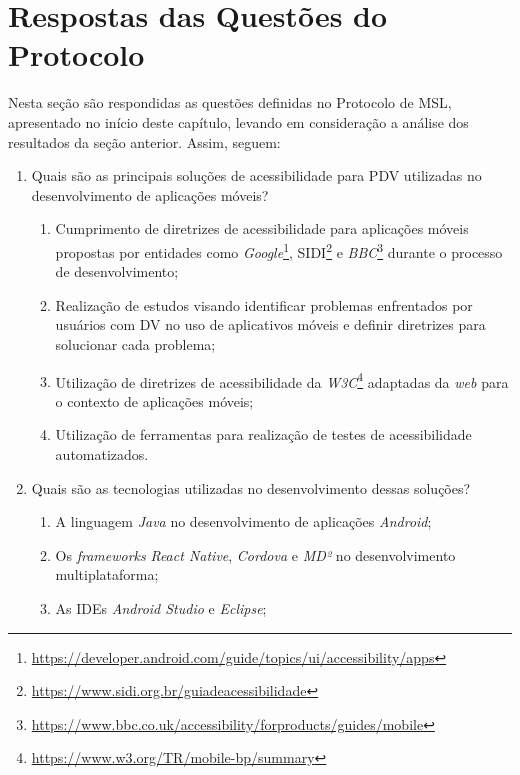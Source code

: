 \newpage

\section{Respostas das Questões do Protocolo}

Nesta seção são respondidas as questões definidas no Protocolo de MSL, apresentado no início deste capítulo, levando em consideração a análise dos resultados da seção anterior.
Assim, seguem:

\begin{enumerate}
    \item Quais são as principais soluções de acessibilidade para PDV utilizadas
          no desenvolvimento de aplicações móveis?
          \begin{enumerate}
              \item Cumprimento de diretrizes de acessibilidade para aplicações móveis propostas por entidades
              como \emph{Google}\footnote{\url{https://developer.android.com/guide/topics/ui/accessibility/apps}},
              SIDI\footnote{\url{https://www.sidi.org.br/guiadeacessibilidade}} e
              \emph{BBC}\footnote{\url{https://www.bbc.co.uk/accessibility/forproducts/guides/mobile}}
              durante o processo de desenvolvimento;
              \item Realização de estudos visando identificar problemas enfrentados por usuários com DV no uso de aplicativos móveis e definir diretrizes para solucionar cada problema;
              \item Utilização de diretrizes de acessibilidade da \emph{W3C}\footnote{\url{https://www.w3.org/TR/mobile-bp/summary}} adaptadas da \emph{web} para o contexto de aplicações móveis;
              \item Utilização de ferramentas para realização de testes de acessibilidade automatizados.
          \end{enumerate}
    \item Quais são as tecnologias utilizadas no desenvolvimento dessas soluções?
          \begin{enumerate}
              \item A linguagem \emph{Java} no desenvolvimento de aplicações \emph{Android};
              \item Os \emph{frameworks} \emph{React Native}, \emph{Cordova} e \emph{MD²} no desenvolvimento multiplataforma;
              \item As IDEs \emph{Android Studio} e \emph{Eclipse};

\end{enumerate}
\end{enumerate}
